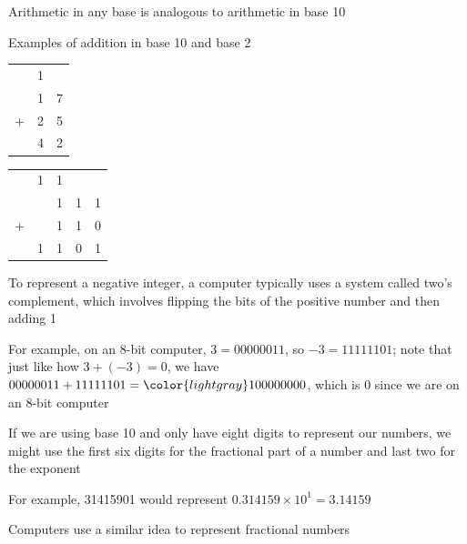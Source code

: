 \documentclass[8pt,a4paper,compress]{beamer}
\begin{document}
\begin{frame}[fragile]
\pause

Arithmetic in any base is analogous to arithmetic in base 10

\pause
\bigskip

Examples of addition in base 10 and base 2
\begin{center}
\begin{tabular}{ccc}
  & 1 &   \\ 
  & 1 & 7 \\
+ & 2 & 5 \\
\hline
  & 4 & 2 \\
\end{tabular}\hspace{2cm} \begin{tabular}{ccccc}
  & 1 & 1 &   \\ 
  &   & 1 & 1 & 1 \\
+ &   & 1 & 1 & 0 \\
\hline
  & 1 & 1 & 0 & 1 \\
\end{tabular}
\end{center}

\pause
\bigskip

To represent a negative integer, a computer typically uses a system called two's complement, which involves flipping the bits of the positive number and then adding 1

\pause
\bigskip

For example, on an 8-bit computer, $3 = 00000011$, so $-3 = 11111101$; note that just like how $3 + (-3) = 0$, we have $00000011 + 11111101 = {\color{lightgray}1}00000000$, which is $0$ since we are on an 8-bit computer
\end{frame}

\begin{frame}[fragile]
\pause

If we are using base 10 and only have eight digits to represent our numbers, we might use the first six digits for the fractional part of a number and last two for the exponent  

\pause
\bigskip

For example, 31415901 would represent $0.314159 \times 10^{1} = 3.14159$

\pause
\bigskip

Computers use a similar idea to represent fractional numbers
\end{frame}
\end{document}
